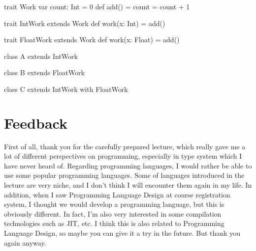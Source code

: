 \documentclass{article}
\begin{document}
\begin{ScalaCode}[mixin]
trait Work {
  var count: Int = 0
  def add() = { count = count + 1 }
}

trait IntWork extends Work {
  def work(x: Int) = { add() }
}

trait FloatWork extends Work {
  def work(x: Float) = { add() }
}

class A extends IntWork {}

class B extends FloatWork {}

class C extends IntWork with FloatWork {}
\end{ScalaCode}

\section{Feedback}
First of all, thank you for the carefully prepared lecture, which really gave me a lot of different perspectives on programming, especially in type system which I have never heard of. Regarding programming languages, I would rather be able to use some popular programming languages. Some of languages introduced in the lecture are very niche, and I don’t think I will encounter them again in my life. In addition, when I saw Programming Language Design at course registration system, I thought we would develop a programming language, but this is obviously different. In fact, I'm also very interested in some compilation technologies such as JIT, etc. I think this is also related to Programming Language Design, so maybe you can give it a try in the future. But thank you again anyway.
\end{document}
